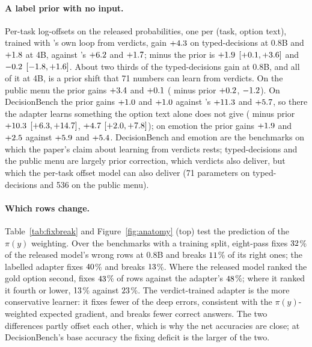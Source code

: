 \paragraph{A label prior with no input.}
Per-task log-offsets on the released probabilities, one per (task, option text), trained with \pk{}'s own loop from verdicts, gain $+4.3$ on typed-decisions at 0.8B and $+1.8$ at 4B, against \pk{}'s $+6.2$ and $+1.7$; \pk{} minus the prior is $+1.9$ $[+0.1, +3.6]$ and $-0.2$ $[-1.8, +1.6]$. About two thirds of the typed-decisions gain at 0.8B, and all of it at 4B, is a prior shift that 71 numbers can learn from verdicts. On the public menu the prior gains $+3.4$ and $+0.1$ (\pk{} minus prior $+0.2$, $-1.2$). On DecisionBench the prior gains $+1.0$ and $+1.0$ against \pk{}'s $+11.3$ and $+5.7$, so there the adapter learns something the option text alone does not give (\pk{} minus prior $+10.3$ $[+6.3, +14.7]$, $+4.7$ $[+2.0, +7.8]$); on emotion the prior gains $+1.9$ and $+2.5$ against $+5.9$ and $+5.4$. DecisionBench and emotion are the benchmarks on which the paper's claim about learning from verdicts rests; typed-decisions and the public menu are largely prior correction, which verdicts also deliver, but which the per-task offset model can also deliver (71 parameters on typed-decisions and 536 on the public menu).

\paragraph{Which rows change.}
Table~\ref{tab:fixbreak} and Figure~\ref{fig:anatomy} (top) test the prediction of the $\pi(y)$ weighting. Over the benchmarks with a training split, eight-pass \pk{} fixes $32$\% of the released model's wrong rows at 0.8B and breaks $11$\% of its right ones; the labelled adapter fixes $40$\% and breaks $13$\%. Where the released model ranked the gold option second, \pk{} fixes $43$\% of rows against the adapter's $48$\%; where it ranked it fourth or lower, $13$\% against $23$\%. The verdict-trained adapter is the more conservative learner: it fixes fewer of the deep errors, consistent with the $\pi(y)$-weighted expected gradient, and breaks fewer correct answers. The two differences partly offset each other, which is why the net accuracies are close; at DecisionBench's base accuracy the fixing deficit is the larger of the two.

